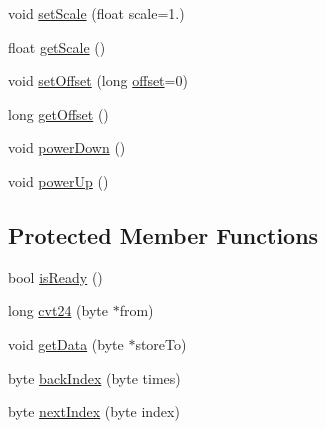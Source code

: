 \begin{DoxyCompactItemize}
void \hyperlink{class_n_b_h_x711_a272ff1fb4222e86f0561ad3d55a6ce28}{set\+Scale} (float scale=1.)
\item 
float \hyperlink{class_n_b_h_x711_a078dafd360269e0505239ba465cc6920}{get\+Scale} ()
\item 
void \hyperlink{class_n_b_h_x711_abb5f2f5ecf96f5cfc19fc0a96ea95b6c}{set\+Offset} (long \hyperlink{class_n_b_h_x711_a2deeadef7a2a07b0f5d799d2b0be13c2}{offset}=0)
\item 
long \hyperlink{class_n_b_h_x711_a415f456a258312956e4b044bc4623190}{get\+Offset} ()
\item 
void \hyperlink{class_n_b_h_x711_ae531f57831caddf1d06d25f058066098}{power\+Down} ()
\item 
void \hyperlink{class_n_b_h_x711_aeeefc08264440e1d0ef11d592f96ef68}{power\+Up} ()
\end{DoxyCompactItemize}
\subsection*{Protected Member Functions}
\begin{DoxyCompactItemize}
\item 
bool \hyperlink{class_n_b_h_x711_a97a82159c3ffd2314c94bf0905703eac}{is\+Ready} ()
\item 
long \hyperlink{class_n_b_h_x711_a260b87b30eb3061c37a11a2ec35730f8}{cvt24} (byte $\ast$from)
\item 
void \hyperlink{class_n_b_h_x711_a54531c0c1d287f530ef450783dcf7738}{get\+Data} (byte $\ast$store\+To)
\item 
byte \hyperlink{class_n_b_h_x711_ac47ea6ff71062c44ef90737a72b3bb1d}{back\+Index} (byte times)
\item 
byte \hyperlink{class_n_b_h_x711_a05ef1302bf8ffd0dfcafe3120c9be835}{next\+Index} (byte index)
\end{DoxyCompactItemize}
